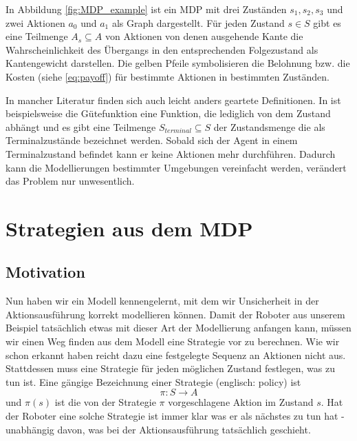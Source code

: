 \documentclass[a4paper]{IEEEtran}
\begin{document}
In Abbildung \ref{fig:MDP_example} ist ein MDP mit drei Zuständen $s_1, s_2, s_3$ und zwei Aktionen $a_0$ und $a_1$ als Graph dargestellt. Für jeden Zustand $s \in S$ gibt es eine Teilmenge $A_s \subseteq A$ von Aktionen von denen ausgehende Kante die Wahrscheinlichkeit des Übergangs in den entsprechenden Folgezustand als Kantengewicht darstellen. Die gelben Pfeile symbolisieren die Belohnung bzw. die Kosten (siehe \ref{eq:payoff}) für bestimmte Aktionen in bestimmten Zuständen.

In mancher Literatur finden sich auch leicht anders geartete Definitionen. In \cite{russell1995artificial} ist beispielsweise die Gütefunktion eine Funktion, die lediglich von dem Zustand abhängt und es gibt eine Teilmenge $S_{terminal} \subseteq S$ der Zustandsmenge die als Terminalzustände bezeichnet werden. Sobald sich der Agent in einem Terminalzustand befindet kann er keine Aktionen mehr durchführen. Dadurch kann die Modellierungen bestimmter Umgebungen vereinfacht werden, verändert das Problem nur unwesentlich.


\section{Strategien aus dem MDP}
\subsection{Motivation}
Nun haben wir ein Modell kennengelernt, mit dem wir Unsicherheit in der Aktionsausführung korrekt modellieren können. Damit der Roboter aus unserem Beispiel tatsächlich etwas mit dieser Art der Modellierung anfangen kann, müssen wir einen Weg finden aus dem Modell eine Strategie vor zu berechnen. Wie wir schon erkannt haben reicht dazu eine festgelegte Sequenz an Aktionen nicht aus. Stattdessen muss eine Strategie für jeden möglichen Zustand festlegen, was zu tun ist. Eine gängige Bezeichnung einer Strategie (englisch: policy) ist
\begin{equation}
	\pi:S \rightarrow A
	\label{eq:policy}
\end{equation}
und $\pi(s)$ ist die von der Strategie $\pi$ vorgeschlagene Aktion im Zustand $s$. Hat der Roboter eine solche Strategie ist immer klar was er als nächstes zu tun hat - unabhängig davon, was bei der Aktionsausführung tatsächlich geschieht.
\end{document}
